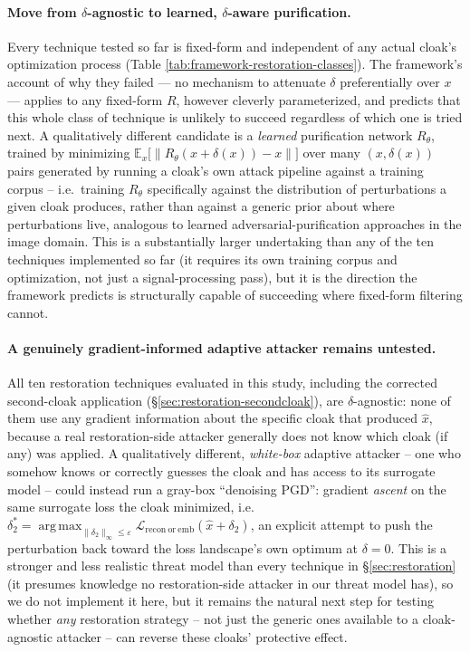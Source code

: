 \documentclass[11pt]{article}
\DeclareMathOperator*{\argmax}{arg\,max}
\begin{document}
\paragraph{Move from $\delta$-agnostic to learned, $\delta$-aware
purification.} Every technique tested so far is fixed-form and
independent of any actual cloak's optimization process (Table
\ref{tab:framework-restoration-classes}). The framework's account of
why they failed --- no mechanism to attenuate $\delta$ preferentially
over $x$ --- applies to any fixed-form $R$, however cleverly
parameterized, and predicts that this whole class of technique is
unlikely to succeed regardless of which one is tried next. A
qualitatively different candidate is a \emph{learned} purification
network $R_\theta$, trained by minimizing
$\mathbb{E}_{x}\big[\|R_\theta(x+\delta(x)) - x\|\big]$ over many
$(x, \delta(x))$ pairs generated by running a cloak's own attack
pipeline against a training corpus -- i.e.\ training $R_\theta$
specifically against the distribution of perturbations a given cloak
produces, rather than against a generic prior about where
perturbations live, analogous to learned adversarial-purification
approaches in the image domain. This is a substantially larger
undertaking than any of the ten techniques implemented so far (it
requires its own training corpus and optimization, not just a
signal-processing pass), but it is the direction the framework
predicts is structurally capable of succeeding where fixed-form
filtering cannot.

\paragraph{A genuinely gradient-informed adaptive attacker remains
untested.} All ten restoration techniques evaluated in this study,
including the corrected second-cloak application
(\S\ref{sec:restoration-secondcloak}), are $\delta$-agnostic: none of
them use any gradient information about the specific cloak that
produced $\hat{x}$, because a real restoration-side attacker generally
does not know which cloak (if any) was applied. A qualitatively
different, \emph{white-box} adaptive attacker -- one who somehow knows
or correctly guesses the cloak and has access to its surrogate model --
could instead run a gray-box ``denoising PGD'': gradient
\emph{ascent} on the same surrogate loss the cloak minimized, i.e.\
$\delta_2^\ast = \argmax_{\|\delta_2\|_\infty \leq \varepsilon}
\mathcal{L}_{\mathrm{recon\ or\ emb}}(\hat{x}+\delta_2)$, an explicit
attempt to push the perturbation back toward the loss landscape's own
optimum at $\delta=0$. This is a stronger and less realistic threat
model than every technique in \S\ref{sec:restoration} (it presumes
knowledge no restoration-side attacker in our threat model has), so we
do not implement it here, but it remains the natural next step for
testing whether \emph{any} restoration strategy -- not just the
generic ones available to a cloak-agnostic attacker -- can reverse
these cloaks' protective effect.
\end{document}
